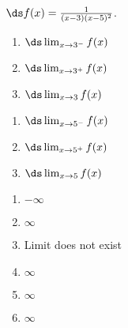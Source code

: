 {$\ds f(x) = \frac{1}{(x-3)(x-5)^2}$.

\begin{minipage}[t]{.5\linewidth}
\begin{enumerate}
\item		$\ds \lim_{x\to 3^-} f(x)$
\item		$\ds \lim_{x\to 3^+} f(x)$
\item		$\ds \lim_{x\to 3} f(x)$
\end{enumerate}
\end{minipage}
\begin{minipage}[t]{.5\linewidth}
\begin{enumerate}\addtocounter{enumii}{3}
\item		$\ds \lim_{x\to 5^-} f(x)$
\item		$\ds \lim_{x\to 5^+} f(x)$
\item		$\ds \lim_{x\to 5} f(x)$
\end{enumerate}
\end{minipage}

}
{\begin{enumerate}
\item	$-\infty$
\item	$\infty$
\item	Limit does not exist
\item	$\infty$
\item	$\infty$
\item	$\infty$
\end{enumerate}
}
